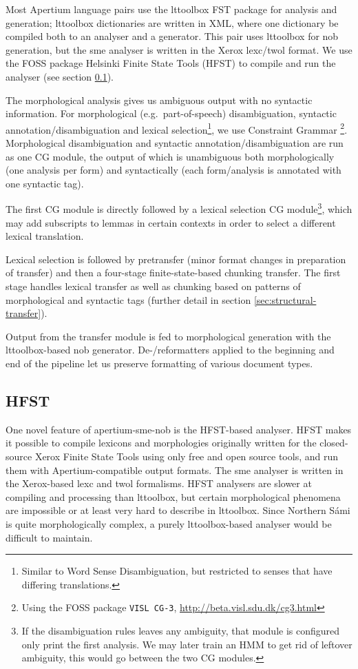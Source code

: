 Most Apertium language pairs use the lttoolbox FST package for
analysis and generation; lttoolbox dictionaries are written in XML,
where one dictionary be compiled both to an analyser and a generator.
This pair uses lttoolbox for nob generation, but the sme analyser is
written in the Xerox lexc/twol format\citep{beesley2003fsm}. We use
the FOSS package Helsinki Finite State Tools (HFST)  to
compile and run the analyser (see section \ref{sec:hfst}).

The morphological analysis gives us ambiguous output with no syntactic
information. For morphological (e.g.~part-of-speech) disambiguation,
syntactic annotation/disambiguation and lexical
selection\footnote{Similar to Word Sense Disambiguation, but
  restricted to senses that have differing translations.}, we use
Constraint Grammar \citep{karlsson1990cgf}\footnote{Using the FOSS
  package {\tt \small VISL CG-3},
  \href{http://beta.visl.sdu.dk/cg3.html}{http://beta.visl.sdu.dk/cg3.html}}. Morphological
disambiguation and syntactic annotation/disambiguation are run as one
CG module, the output of which is unambiguous both morphologically
(one analysis per form) and syntactically (each form/analysis is
annotated with one syntactic tag). 

The first CG module is directly followed by a lexical selection CG
module\footnote{If the disambiguation rules leaves any ambiguity, that
  module is configured only print the first analysis. We may later
  train an HMM to get rid of leftover ambiguity, this would go between
  the two CG modules.}, which may add subscripts to lemmas in certain
contexts in order to select a different lexical translation. 

Lexical selection is followed by pretransfer (minor format changes in
preparation of transfer) and then a four-stage finite-state-based
chunking transfer. The first stage handles lexical transfer as well as
chunking based on patterns of morphological and syntactic tags
(further detail in section \ref{sec:structural-transfer}).

Output from the transfer module is fed to morphological generation
with the lttoolbox-based nob generator. De-/reformatters applied to
the beginning and end of the pipeline let us preserve formatting of
various document types.

\subsection{HFST}
\label{sec:hfst}
One novel feature of apertium-sme-nob is the HFST-based analyser. HFST
makes it possible to compile lexicons and morphologies originally
written for the closed-source Xerox Finite State Tools using only free
and open source tools, and run them with Apertium-compatible output
formats. The sme analyser is written in the Xerox-based lexc and twol
formalisms. HFST analysers are slower at compiling and processing than
lttoolbox, but certain morphological phenomena are impossible or at
least very hard to describe in lttoolbox. Since Northern Sámi is quite
morphologically complex, a purely lttoolbox-based analyser would be
difficult to maintain.

